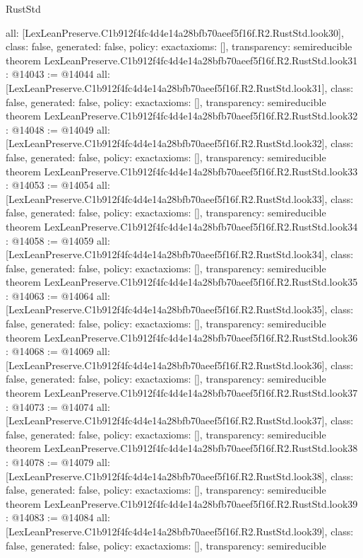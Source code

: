 \begin{lexlean}{RustStd}
\begin{coremodule}
{  all: [LexLeanPreserve.C1b912f4fc4d4e14a28bfb70aeef5f16f.R2.RustStd.look30],
  class: false,
  generated: false,
  policy: exact{axioms: []},
  transparency: semireducible
}
theorem LexLeanPreserve.C1b912f4fc4d4e14a28bfb70aeef5f16f.R2.RustStd.look31 : @14043 := @14044 {
  all: [LexLeanPreserve.C1b912f4fc4d4e14a28bfb70aeef5f16f.R2.RustStd.look31],
  class: false,
  generated: false,
  policy: exact{axioms: []},
  transparency: semireducible
}
theorem LexLeanPreserve.C1b912f4fc4d4e14a28bfb70aeef5f16f.R2.RustStd.look32 : @14048 := @14049 {
  all: [LexLeanPreserve.C1b912f4fc4d4e14a28bfb70aeef5f16f.R2.RustStd.look32],
  class: false,
  generated: false,
  policy: exact{axioms: []},
  transparency: semireducible
}
theorem LexLeanPreserve.C1b912f4fc4d4e14a28bfb70aeef5f16f.R2.RustStd.look33 : @14053 := @14054 {
  all: [LexLeanPreserve.C1b912f4fc4d4e14a28bfb70aeef5f16f.R2.RustStd.look33],
  class: false,
  generated: false,
  policy: exact{axioms: []},
  transparency: semireducible
}
theorem LexLeanPreserve.C1b912f4fc4d4e14a28bfb70aeef5f16f.R2.RustStd.look34 : @14058 := @14059 {
  all: [LexLeanPreserve.C1b912f4fc4d4e14a28bfb70aeef5f16f.R2.RustStd.look34],
  class: false,
  generated: false,
  policy: exact{axioms: []},
  transparency: semireducible
}
theorem LexLeanPreserve.C1b912f4fc4d4e14a28bfb70aeef5f16f.R2.RustStd.look35 : @14063 := @14064 {
  all: [LexLeanPreserve.C1b912f4fc4d4e14a28bfb70aeef5f16f.R2.RustStd.look35],
  class: false,
  generated: false,
  policy: exact{axioms: []},
  transparency: semireducible
}
theorem LexLeanPreserve.C1b912f4fc4d4e14a28bfb70aeef5f16f.R2.RustStd.look36 : @14068 := @14069 {
  all: [LexLeanPreserve.C1b912f4fc4d4e14a28bfb70aeef5f16f.R2.RustStd.look36],
  class: false,
  generated: false,
  policy: exact{axioms: []},
  transparency: semireducible
}
theorem LexLeanPreserve.C1b912f4fc4d4e14a28bfb70aeef5f16f.R2.RustStd.look37 : @14073 := @14074 {
  all: [LexLeanPreserve.C1b912f4fc4d4e14a28bfb70aeef5f16f.R2.RustStd.look37],
  class: false,
  generated: false,
  policy: exact{axioms: []},
  transparency: semireducible
}
theorem LexLeanPreserve.C1b912f4fc4d4e14a28bfb70aeef5f16f.R2.RustStd.look38 : @14078 := @14079 {
  all: [LexLeanPreserve.C1b912f4fc4d4e14a28bfb70aeef5f16f.R2.RustStd.look38],
  class: false,
  generated: false,
  policy: exact{axioms: []},
  transparency: semireducible
}
theorem LexLeanPreserve.C1b912f4fc4d4e14a28bfb70aeef5f16f.R2.RustStd.look39 : @14083 := @14084 {
  all: [LexLeanPreserve.C1b912f4fc4d4e14a28bfb70aeef5f16f.R2.RustStd.look39],
  class: false,
  generated: false,
  policy: exact{axioms: []},
  transparency: semireducible
}
\end{coremodule}
\end{lexlean}
